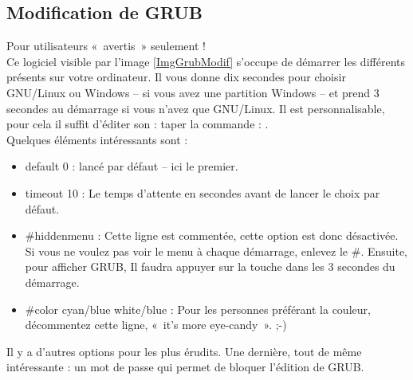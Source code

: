 \subsection{Modification de GRUB}
Pour utilisateurs «~avertis~» seulement !\\
Ce logiciel visible par l'image \ref{ImgGrubModif} s'occupe de démarrer les différents  présents sur votre ordinateur. Il vous donne dix secondes pour choisir GNU/Linux ou Windows -- si vous avez une partition Windows -- et prend 3 secondes au démarrage si vous n'avez que GNU/Linux. Il est personnalisable, pour cela il suffit d'éditer son  : taper la commande : .\\
Quelques éléments intéressants sont :
\begin{itemize}
\item default 0 :  lancé par défaut -- ici le premier.
\item timeout 10 : Le temps d'attente en secondes avant de lancer le choix par défaut.
\item \#{}hiddenmenu : Cette ligne est commentée, cette option est donc désactivée. Si vous ne voulez pas voir le menu à chaque démarrage, enlevez le \#. Ensuite, pour afficher GRUB, Il faudra appuyer sur la touche  dans les 3 secondes du démarrage.
\item \#{}color cyan/blue white/blue : Pour les personnes préférant la couleur, décommentez cette ligne, «~it's more eye-candy~». ;-)
\end{itemize}
Il y a d'autres options pour les plus érudits. Une dernière, tout de même intéressante : un mot de passe qui permet de bloquer l'édition de GRUB.\par
